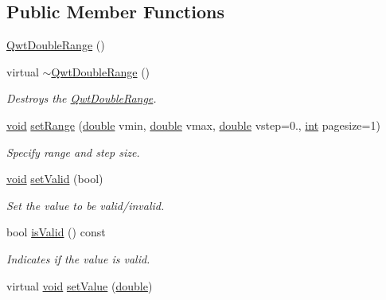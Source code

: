 \subsection*{Public Member Functions}
\begin{DoxyCompactItemize}
\item 
\hyperlink{class_qwt_double_range_a86f9f76df03d7917d88a95d1667f2d72}{Qwt\-Double\-Range} ()
\item 
virtual \hyperlink{class_qwt_double_range_abdcecda4b14ba81cfdaf063e2b98a22d}{$\sim$\-Qwt\-Double\-Range} ()
\begin{DoxyCompactList}\small\item\em Destroys the \hyperlink{class_qwt_double_range}{Qwt\-Double\-Range}. \end{DoxyCompactList}\item 
\hyperlink{group___u_a_v_objects_plugin_ga444cf2ff3f0ecbe028adce838d373f5c}{void} \hyperlink{class_qwt_double_range_a43891011664b74b8e5454763a3f5ff21}{set\-Range} (\hyperlink{_super_l_u_support_8h_a8956b2b9f49bf918deed98379d159ca7}{double} vmin, \hyperlink{_super_l_u_support_8h_a8956b2b9f49bf918deed98379d159ca7}{double} vmax, \hyperlink{_super_l_u_support_8h_a8956b2b9f49bf918deed98379d159ca7}{double} vstep=0., \hyperlink{ioapi_8h_a787fa3cf048117ba7123753c1e74fcd6}{int} pagesize=1)
\begin{DoxyCompactList}\small\item\em Specify range and step size. \end{DoxyCompactList}\item 
\hyperlink{group___u_a_v_objects_plugin_ga444cf2ff3f0ecbe028adce838d373f5c}{void} \hyperlink{class_qwt_double_range_a50a9c386663e170016a74cf8ee28ab8f}{set\-Valid} (bool)
\begin{DoxyCompactList}\small\item\em Set the value to be valid/invalid. \end{DoxyCompactList}\item 
bool \hyperlink{class_qwt_double_range_afc4921deb3f68a64cc08b0654a040bc6}{is\-Valid} () const 
\begin{DoxyCompactList}\small\item\em Indicates if the value is valid. \end{DoxyCompactList}\item 
virtual \hyperlink{group___u_a_v_objects_plugin_ga444cf2ff3f0ecbe028adce838d373f5c}{void} \hyperlink{class_qwt_double_range_af6a3aa74c970a2bef29f0c1af99720e8}{set\-Value} (\hyperlink{_super_l_u_support_8h_a8956b2b9f49bf918deed98379d159ca7}{double})

\end{DoxyCompactItemize}
